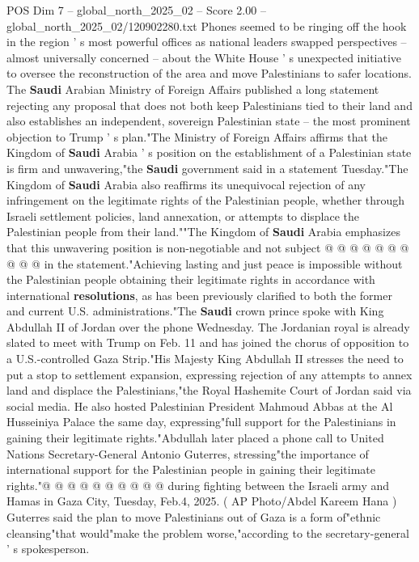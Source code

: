 \begin{textsample}{POS Dim 7 – global\_north\_2025\_02 – Score 2.00 – global\_north\_2025\_02/120902280.txt}  \label{ex:f7_pos_389}
Phones seemed to be ringing off the hook in the region ' s most powerful offices as national leaders swapped perspectives -- almost universally concerned -- about the White House ' s unexpected initiative to oversee the reconstruction of the area and move Palestinians to safer locations.
The \textbf{Saudi} Arabian Ministry of Foreign Affairs published a long statement rejecting any proposal that does not both keep Palestinians tied to their land and also establishes an independent, sovereign Palestinian state -- the most prominent objection to Trump ' s plan."The Ministry of Foreign Affairs affirms that the Kingdom of \textbf{Saudi} Arabia ' s position on the establishment of a Palestinian state is firm and unwavering,"the \textbf{Saudi} government said in a statement Tuesday."The Kingdom of \textbf{Saudi} Arabia also reaffirms its unequivocal rejection of any infringement on the legitimate rights of the Palestinian people, whether through Israeli settlement policies, land annexation, or attempts to displace the Palestinian people from their land.""The Kingdom of \textbf{Saudi} Arabia emphasizes that this unwavering position is non-negotiable and not subject @ @ @ @ @ @ @ @ @ @ in the statement."Achieving lasting and just peace is impossible without the Palestinian people obtaining their legitimate rights in accordance with international \textbf{resolutions}, as has been previously clarified to both the former and current U.S. administrations."The \textbf{Saudi} crown prince spoke with King Abdullah II of Jordan over the phone Wednesday.
The Jordanian royal is already slated to meet with Trump on Feb. 11 and has joined the chorus of opposition to a U.S.-controlled Gaza Strip."His Majesty King Abdullah II stresses the need to put a stop to settlement expansion, expressing rejection of any attempts to annex land and displace the Palestinians,"the Royal Hashemite Court of Jordan said via social media.
He also hosted Palestinian President Mahmoud Abbas at the Al Husseiniya Palace the same day, expressing"full support for the Palestinians in gaining their legitimate rights."Abdullah later placed a phone call to United Nations Secretary-General Antonio Guterres, stressing"the importance of international support for the Palestinian people in gaining their legitimate rights."@ @ @ @ @ @ @ @ @ @ during fighting between the Israeli army and Hamas in Gaza City, Tuesday, Feb.4, 2025. ( AP Photo/Abdel Kareem Hana ) Guterres said the plan to move Palestinians out of Gaza is a form of"ethnic cleansing"that would"make the problem worse,"according to the secretary-general ' s spokesperson.

\end{textsample}

